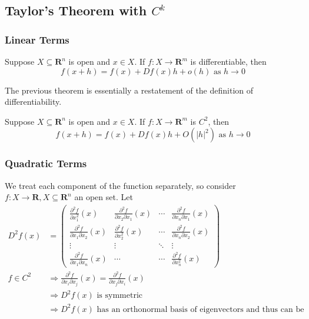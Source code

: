 \documentclass[11pt]{elegantbook}
\begin{document}
\subsection{Taylor's Theorem with $C^k$}
\subsubsection*{Linear Terms}
\begin{theorem}
    Suppose $X \subseteq \mathbf{R}^n$ is open and $x \in X$. If $f: X \rightarrow \mathbf{R}^m$ is differentiable, then
    $$
    f(x+h)=f(x)+D f(x) h+o(h) \text { as } h \rightarrow 0
    $$
\end{theorem}
The previous theorem is essentially a restatement of the definition of differentiability.

\begin{theorem}
    Suppose $X \subseteq \mathbf{R}^n$ is open and $x \in X$. If $f: X \rightarrow \mathbf{R}^m$ is $C^2$, then
    $$
    f(x+h)=f(x)+D f(x) h+O\left(|h|^2\right) \text { as } h \rightarrow 0
    $$
\end{theorem}

\subsubsection*{Quadratic Terms}
We treat each component of the function separately, so consider $f: X \rightarrow \mathbf{R}, X \subseteq \mathbf{R}^n$ an open set. Let
$$
\begin{aligned}
D^2 f(x) & =\left(\begin{array}{cccc}
\frac{\partial^2 f}{\partial x_1^2}(x) & \frac{\partial^2 f}{\partial x_2 \partial x_1}(x) & \cdots & \frac{\partial^2 f}{\partial x_n \partial x_1}(x) \\
\frac{\partial^2 f}{\partial x_1 \partial x_2}(x) & \frac{\partial^2 f}{\partial x_2^2}(x) & \cdots & \frac{\partial^2 f}{\partial x_n \partial x_2}(x) \\
\vdots & \vdots & \ddots & \vdots \\
\frac{\partial^2 f}{\partial x_1 \partial x_n}(x) & \cdots & \cdots & \frac{\partial^2 f}{\partial x_n^2}(x)
\end{array}\right) \\
f \in C^2 & \Rightarrow \frac{\partial^2 f}{\partial x_i \partial x_j}(x)=\frac{\partial^2 f}{\partial x_j \partial x_i}(x) \\
& \Rightarrow D^2 f(x) \text { is symmetric } \\
& \Rightarrow D^2 f(x) \text { has an orthonormal basis of eigenvectors and thus can be diagonalized}
\end{aligned}
$$
\end{document}
